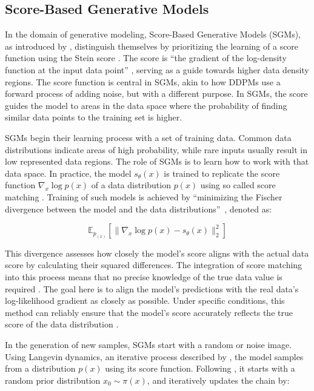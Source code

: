 \subsection{Score-Based Generative Models}\label{SGMs}

In the domain of generative modeling, Score-Based Generative Models (SGMs), as introduced by \citeauthor{song2019SGM}, distinguish themselves by prioritizing the learning of a score function using the Stein score \citep{steinScore}. The score is ``the gradient of the log-density function at the input data point'' \citep{song2019SGM}, serving as a guide towards higher data density regions. The score function is central in SGMs, akin to how DDPMs use a forward process of adding noise, but with a different purpose. In SGMs, the score guides the model to areas in the data space where the probability of finding similar data points to the training set is higher.

SGMs begin their learning process with a set of training data. Common data distributions indicate areas of high probability, while rare inputs usually result in low represented data regions. The role of SGMs is to learn how to work with that data space. In practice, the model \(s_\theta(x)\) is trained to replicate the score function \(\nabla_x \log{p(x)}\) of a data distribution \(p(x)\) using so called score matching \citep{hyvarinenScoreMatching}. Training of such models is achieved by ``minimizing the Fischer divergence between the model and the data distributions''~\citeauthor{song2021score}, denoted as: 

\[
\mathbb{E}_{p_{(x)}} \left[ \| \nabla_x \log{p(x)} - s_\theta(x) \| ^2_2 \right]
\] 

This divergence assesses how closely the model's score aligns with the actual data score by calculating their squared differences. The integration of score matching into this process means that no precise knowledge of the true data value is required \citep{song2021score}. The goal here is to align the model's predictions with the real data's log-likelihood gradient as closely as possible. Under specific conditions, this method can reliably ensure that the model's score accurately reflects the true score of the data distribution \citep{song2019SGM}.

In the generation of new samples, SGMs start with a random or noise image. Using Langevin dynamics, an iterative process described by \citep{robertsLangevin}, the model samples from a distribution \( p(x) \) using its score function. Following \citeauthor{song2021score}, it starts with a random prior distribution \( x_0 \sim \pi(x) \), and iteratively updates the chain by:

